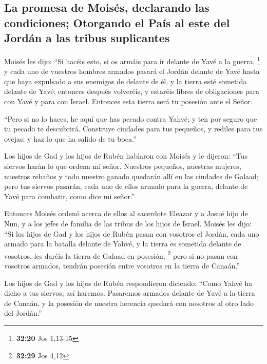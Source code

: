 \begin{paracol}{2}
\hypertarget{la-promesa-de-moisuxe9s-declarando-las-condiciones-otorgando-el-pauxeds-al-este-del-jorduxe1n-a-las-tribus-suplicantes}{%
\subsection{La promesa de Moisés, declarando las condiciones; Otorgando
el País al este del Jordán a las tribus
suplicantes}\label{la-promesa-de-moisuxe9s-declarando-las-condiciones-otorgando-el-pauxeds-al-este-del-jorduxe1n-a-las-tribus-suplicantes}}

 Moisés les dijo: ``Si hacéis esto, si os armáis para ir
delante de Yavé a la guerra, \footnote{\textbf{32:20} Jos 1,13-15}
 y cada uno de vuestros hombres armados pasará el Jordán
delante de Yavé hasta que haya expulsado a sus enemigos de delante de
él,  y la tierra esté sometida delante de Yavé; entonces
después volveréis, y estaréis libres de obligaciones para con Yavé y
para con Israel. Entonces esta tierra será tu posesión ante el Señor.

 ``Pero si no lo haces, he aquí que has pecado contra
Yahvé; y ten por seguro que tu pecado te descubrirá. 
Construye ciudades para tus pequeños, y rediles para tus ovejas; y haz
lo que ha salido de tu boca.''

 Los hijos de Gad y los hijos de Rubén hablaron con
Moisés y le dijeron: ``Tus siervos harán lo que ordena mi señor.
 Nuestros pequeños, nuestras mujeres, nuestros rebaños y
todo nuestro ganado quedarán allí en las ciudades de Galaad;
 pero tus siervos pasarán, cada uno de ellos armado para
la guerra, delante de Yavé para combatir, como dice mi señor.''

 Entonces Moisés ordenó acerca de ellos al sacerdote
Eleazar y a Josué hijo de Nun, y a los jefes de familia de las tribus de
los hijos de Israel.  Moisés les dijo: ``Si los hijos de
Gad y los hijos de Rubén pasan con vosotros el Jordán, cada uno armado
para la batalla delante de Yahvé, y la tierra es sometida delante de
vosotros, les daréis la tierra de Galaad en posesión; \footnote{\textbf{32:29}
  Jos 4,12}  pero si no pasan con vosotros armados,
tendrán posesión entre vosotros en la tierra de Canaán.''

 Los hijos de Gad y los hijos de Rubén respondieron
diciendo: ``Como Yahvé ha dicho a tus siervos, así haremos.
 Pasaremos armados delante de Yavé a la tierra de Canaán,
y la posesión de nuestra herencia quedará con nosotros al otro lado del
Jordán.''


\end{paracol}
